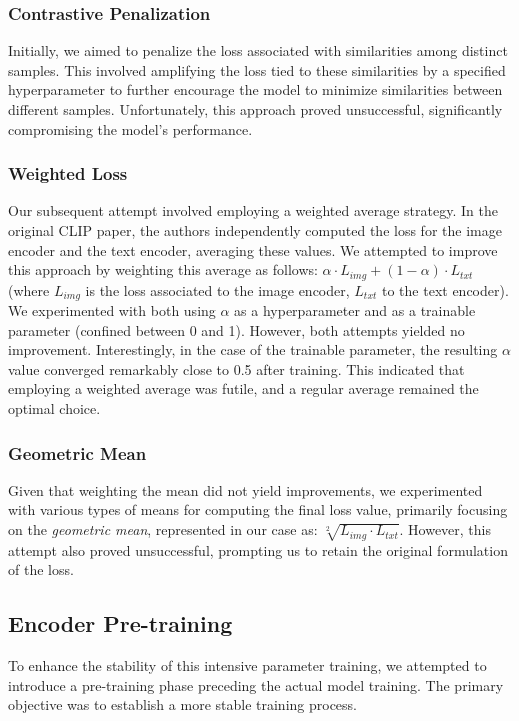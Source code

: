 \documentclass[10pt,twocolumn,letterpaper]{article}
\begin{document}
\subsubsection{Contrastive Penalization}
Initially, we aimed to penalize the loss associated with similarities among distinct samples. This involved amplifying the loss tied to these similarities by a specified hyperparameter to further encourage the model to minimize similarities between different samples. Unfortunately, this approach proved unsuccessful, significantly compromising the model's performance.

\subsubsection{Weighted Loss}
Our subsequent attempt involved employing a weighted average strategy. In the original CLIP paper, the authors independently computed the loss for the image encoder and the text encoder, averaging these values. We attempted to improve this approach by weighting this average as follows: $\alpha \cdot L_{img} + (1 - \alpha) \cdot L_{txt}$ (where $L_{img}$ is the loss associated to the image encoder, $L_{txt}$ to the text encoder). We experimented with both using $\alpha$ as a hyperparameter and as a trainable parameter (confined between 0 and 1). However, both attempts yielded no improvement. Interestingly, in the case of the trainable parameter, the resulting $\alpha$ value converged remarkably close to 0.5 after training. This indicated that employing a weighted average was futile, and a regular average remained the optimal choice.


\subsubsection{Geometric Mean}
Given that weighting the mean did not yield improvements, we experimented with various types of means for computing the final loss value, primarily focusing on the \textit{geometric mean}, represented in our case as: $\sqrt[2]{L_{img} \cdot L_{txt}}$. However, this attempt also proved unsuccessful, prompting us to retain the original formulation of the loss.

\subsection{Encoder Pre-training}
To enhance the stability of this intensive parameter training, we attempted to introduce a pre-training phase preceding the actual model training. The primary objective was to establish a more stable training process.
\end{document}

